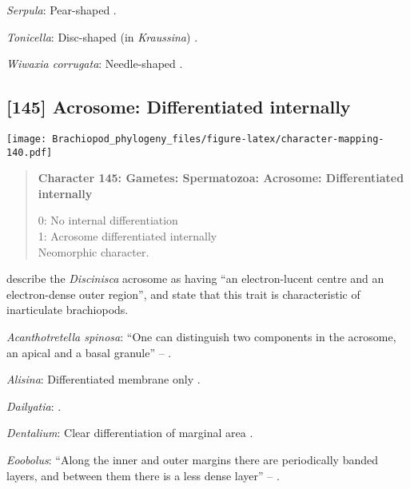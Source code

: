 \documentclass[openany]{book}
\theoremstyle{definition}
\theoremstyle{definition}
\theoremstyle{definition}
\theoremstyle{remark}
\begin{document}
\hypertarget{Serpula-coding-144}{}
\emph{Serpula}: Pear-shaped \citep{Hodgson1994Ultrastructureof}.

\hypertarget{Tonicella-coding-144}{}
\emph{Tonicella}: Disc-shaped (in \emph{Kraussina})
\citep{Hodgson1994Ultrastructureof}.

\hypertarget{Wiwaxia_corrugata-coding-144}{}
\emph{Wiwaxia corrugata}: Needle-shaped
\citep{Reunov2004Ultrastructuralstudy}.

\subsection*{{[}145{]} Acrosome: Differentiated
internally}\label{acrosome-differentiated-internally}

\texttt{[image: Brachiopod\_phylogeny\_files/figure-latex/character-mapping-140.pdf]}

\begin{quote}
\textbf{Character 145: Gametes: Spermatozoa: Acrosome: Differentiated
internally}

0: No internal differentiation\\
1: Acrosome differentiated internally\\
Neomorphic character.
\end{quote}

\citet{Hodgson1994Ultrastructureof} describe the \emph{Discinisca}
acrosome as having ``an electron-lucent centre and an electron-dense
outer region'', and state that this trait is characteristic of
inarticulate brachiopods.

\hypertarget{Acanthotretella_spinosa-coding-145}{}
\emph{Acanthotretella spinosa}: ``One can distinguish two components in
the acrosome, an apical and a basal granule'' --
\citet{BucklandNicks1988}.

\hypertarget{Alisina-coding-145}{}
\emph{Alisina}: Differentiated membrane only \citep{DufresneDube1983}.

\hypertarget{Dailyatia-coding-145}{}
\emph{Dailyatia}: \citet{Gherardi2011}.

\hypertarget{Dentalium-coding-145}{}
\emph{Dentalium}: Clear differentiation of marginal area
\citep{Fukumoto2003Theacrosome}.

\hypertarget{Eoobolus-coding-145}{}
\emph{Eoobolus}: ``Along the inner and outer margins there are
periodically banded layers, and between them there is a less dense
layer'' -- \citet{Afzelius1978Finestructure}.
\end{document}
